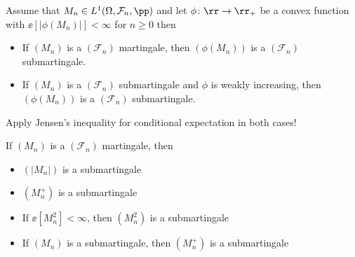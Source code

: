 \documentclass[../main.tex]{subfiles}
\begin{document}
\begin{proposition}
  Assume that $M_n \in L^1(\Omega, \mathcal{F}_n, \pp)$ and let $\phi\colon \rr
  \to \rr_+$ be a convex function with $\ee[|\phi(M_n)|] < \infty$ for $n \geq 0$
  then
  \begin{itemize}
    \item If $(M_n)$ is a $(\mathcal{F}_n)$ martingale, then $(\phi(M_n))$ is a
      $(\mathcal{F}_n)$ submartingale.

    \item If $(M_n)$ is a $(\mathcal{F}_n)$ submartingale and $\phi$ is weakly
      increasing, then $(\phi(M_n))$ is a $(\mathcal{F}_n)$ submartingale.
  \end{itemize}
\end{proposition}
\begin{sketch}
    Apply Jensen's inequality for conditional expectation in both cases!
\end{sketch}
\begin{corollary}
  If $(M_n)$ is a $(\mathcal{F}_n)$ martingale, then
\begin{itemize}
  \item $(|M_n|)$ is a submartingale
  \item $(M_n^+)$ is a submartingale
  \item If $\ee[M_n^2] < \infty$, then $(M_n^2)$ is a submartingale
  \item If $(M_n)$ is a submartingale, then $(M_n^+)$ is a submartingale
\end{itemize}
\end{corollary}
\end{document}
